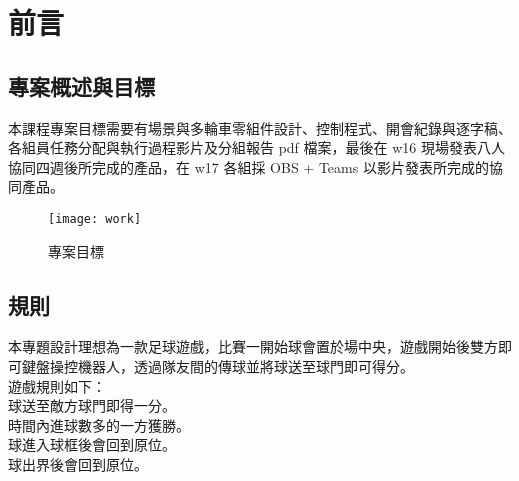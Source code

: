 \chapter{前言}
\renewcommand{\baselinestretch}{10.0} %
\setcounter{page}{1}  %
\fontsize{14pt}{2.5pt}\sectionef
\section{專案概述與目標}
本課程專案目標需要有場景與多輪車零組件設計、控制程式、開會紀錄與逐字稿、各組員任務分配與執行過程影片及分組報告 pdf 檔案，最後在 w16 現場發表八人協同四週後所完成的產品，在 w17 各組採 OBS + Teams 以影片發表所完成的協同產品。
\begin{figure}[hbt!]
\begin{center}
\texttt{[image: work]}
\caption{\Large 專案目標}\label{專案目標}
\end{center}
\end{figure} 

\section{規則}
本專題設計理想為一款足球遊戲，比賽一開始球會置於場中央，遊戲開始後雙方即
可鍵盤操控機器人，透過隊友間的傳球並將球送至球門即可得分。\\
遊戲規則如下：\\
球送至敵方球門即得一分。\\
時間內進球數多的一方獲勝。\\
球進入球框後會回到原位。\\
球出界後會回到原位。\\
\renewcommand{\baselinestretch}{0.5} %